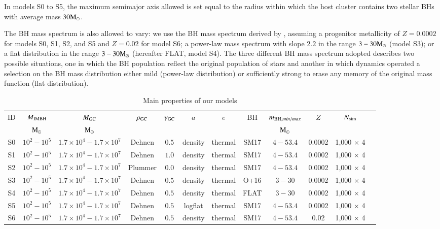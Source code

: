 \documentclass[article]{aa}
\newcommand{\Ms}{{\rm M}_\odot}
\newcommand{\gc}{{\rm GC}}
\newcommand{\ibh}{{\rm IMBH}}
\newcommand{\bh}{{\rm BH}}
\begin{document}
{In models S0 to S5, the maximum semimajor axis allowed is set equal to the radius within which the host cluster contains two stellar BHs with average mass $30\Ms$. 

The BH mass spectrum is also allowed to vary: we use the BH mass spectrum derived by \citep[SM17][]{spera17}, assuming a progenitor metallicity of $Z = 0.0002$ for models S0, S1, S2, and S5 and $Z = 0.02$ for model S6; a power-law mass spectrum with slope $2.2$ \citep[O16][]{oleary16} in the range $3-30 \Ms$ (model S3); or a flat distribution in the range $3-30 \Ms$ (hereafter FLAT, model S4). The three different BH mass spectrum adopted describes two possible situations, one in which the BH population reflect the original population of stars and another in which dynamics operated a selection on the BH mass distribution either mild (power-law distribution) or sufficiently strong to erase any memory of the original mass function (flat distribution). 
}


\begin{table}
\caption{Main properties of our models}
\begin{center}
\begin{tabular}{cccccccccccc}
\hline
\hline
ID & $M_\ibh$ & $M_\gc$ & $\rho_\gc$ & $\gamma_\gc$ & $a$ &$e$ &BH & $m_{\bh, min/max}$ & $Z$ & $N_{\rm sim}$ \\ 
   & $\Ms$    & $\Ms$   &            &              &     &    &   & $\Ms$              &     & \\
\hline
S0 & $10^2-10^5$ & $1.7\times 10^4 - 1.7\times 10^7$ & Dehnen & $0.5$ & density & thermal & SM17 & $4-53.4$ & 0.0002 & 1,000 $\times$ 4 \\
S1 & $10^2-10^5$ & $1.7\times 10^4 - 1.7\times 10^7$ & Dehnen & $1.0$ & density & thermal & SM17 & $4-53.4$ & 0.0002 & 1,000 $\times$ 4 \\
S2 & $10^2-10^5$ & $1.7\times 10^4 - 1.7\times 10^7$ & Plummer& $0.0$ & density & thermal & SM17 & $4-53.4$ & 0.0002 & 1,000 $\times$ 4 \\
S3 & $10^2-10^5$ & $1.7\times 10^4 - 1.7\times 10^7$ & Dehnen & $0.5$ & density & thermal & O+16 & $3-30$ & 0.0002 & 1,000 $\times$ 4 \\
S4 & $10^2-10^5$ & $1.7\times 10^4 - 1.7\times 10^7$ & Dehnen & $0.5$ & density & thermal & FLAT & $3-30$ & 0.0002 & 1,000 $\times$ 4 \\
S5 & $10^2-10^5$ & $1.7\times 10^4 - 1.7\times 10^7$ & Dehnen & $0.5$ & logflat & thermal & SM17 & $4-53.4$ & 0.0002 & 1,000 $\times$ 4 \\
S6 & $10^2-10^5$ & $1.7\times 10^4 - 1.7\times 10^7$ & Dehnen & $0.5$ & density & thermal & SM17 & $4-53.4$ & 0.02   & 1,000 $\times$ 4 \\
\hline
\end{tabular}
\label{tabt1}
\end{center}
\end{table}
\end{document}
